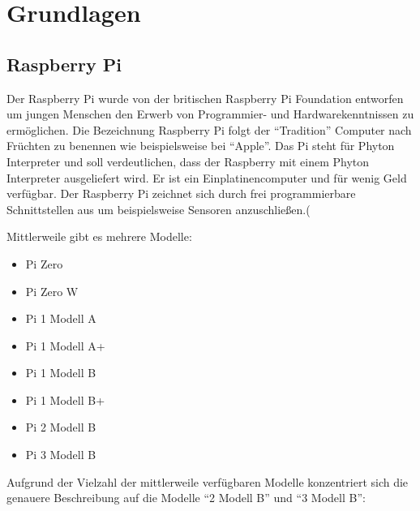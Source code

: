 
\chapter{Grundlagen}
\section{Raspberry Pi}\label{Raspberry}

Der Raspberry Pi wurde von der britischen Raspberry Pi Foundation entworfen um jungen Menschen den Erwerb von Programmier- und Hardwarekenntnissen zu
ermöglichen. Die Bezeichnung Raspberry Pi folgt der "`Tradition"' Computer nach Früchten zu benennen wie beispielsweise bei "`Apple"'. Das Pi steht für Phyton Interpreter und soll verdeutlichen, dass der Raspberry mit einem Phyton Interpreter ausgeliefert wird. Er ist ein Einplatinencomputer und für wenig Geld verfügbar. Der Raspberry Pi zeichnet sich durch frei programmierbare Schnittstellen aus um beispielsweise Sensoren anzuschließen.(\cite{SWB-435432907}

Mittlerweile gibt es mehrere Modelle:

\begin{itemize} 
\item Pi Zero 
\item Pi Zero W
\item Pi 1 Modell A
\item Pi 1 Modell A+
\item Pi 1 Modell B
\item Pi 1 Modell B+
\item Pi 2 Modell B
\item Pi 3 Modell B 
\end{itemize}

Aufgrund der Vielzahl der mittlerweile verfügbaren Modelle konzentriert sich die genauere Beschreibung auf die Modelle "`2 Modell B"' und "`3 Modell B"':

